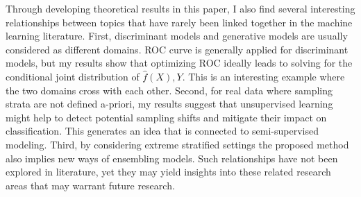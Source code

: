\documentclass{article} %
\begin{document}
Through developing theoretical results in this paper, I also find several interesting relationships between topics that have rarely been linked together in the machine learning literature. First, discriminant models and generative models are usually considered as different domains. ROC curve is generally applied for discriminant models, but my results show that optimizing ROC ideally leads to solving for the conditional joint distribution of $\hat f(X),Y$. This is an interesting example where the two domains cross with each other. Second, for real data where sampling strata are not defined a-priori, my results suggest that unsupervised learning might help to detect potential sampling shifts and mitigate their impact on classification. This generates an idea that is connected to semi-supervised modeling. Third, by considering extreme stratified settings the proposed method also implies new ways of ensembling models. Such relationships have not been explored in literature, yet they may yield insights into these related research areas that may warrant future research.




\appendix
\end{document}
